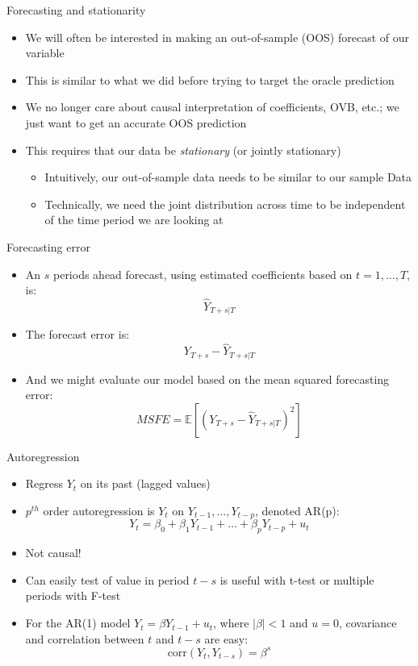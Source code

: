\documentclass[aspectratio=169]{beamer}
\begin{document}
\begin{frame}{Forecasting and stationarity}
    \begin{itemize}
       \item We will often be interested in making an out-of-sample (OOS) forecast of our variable
       \item This is similar to what we did before trying to target the oracle prediction
       \item We no longer care about causal interpretation of coefficients, OVB, etc.; we just want to get an accurate OOS prediction
       \item This requires that our data be \textit{stationary} (or jointly stationary)
       \begin{itemize}
        \item Intuitively, our out-of-sample data needs to be similar to our sample Data
        \item Technically, we need the joint distribution across time to be independent of the time period we are looking at
       \end{itemize}
    \end{itemize}
\end{frame}

\begin{frame}{Forecasting error}
    \begin{itemize}
       \item An $s$ periods ahead forecast, using estimated coefficients based on $t = 1 , \dots, T$, is:
       $$
        \hat{Y}_{T+s|T}
       $$
       \item The forecast error is:
        $$
        Y_{T+s} - \hat{Y}_{T+s|T}
        $$
        \item And we might evaluate our model based on the mean squared forecasting error:
        $$
        MSFE  = \mathbb{E} \left[ \left( Y_{T+s} - \hat{Y}_{T+s|T} \right)^2 \right]
        $$
    \end{itemize}
\end{frame}

\begin{frame}{Autoregression}
    \begin{itemize}
       \item Regress $Y_t$ on its past (lagged values)
       \item $p^{th}$ order autoregression is $Y_t$ on $Y_{t-1}, \dots, Y_{t-p}$, denoted AR(p):
       $$
        Y_t = \beta_0 + \beta_1 Y_{t-1} + \dots + \beta_p Y_{t-p} + u_t
       $$
       \item Not causal!
       \item Can easily test of value in period $t-s$ is useful with t-test or multiple periods with F-test
       \item For the AR(1) model $Y_t = \beta Y_{t-1} + u_t$, where $| \beta | <1$ and $u = 0$, covariance and correlation between $t$ and $t-s$ are easy:
       $$
        \text{corr} (Y_t, Y_{t-s}) = \beta^s
       $$
    \end{itemize}
\end{frame}
\end{document}
